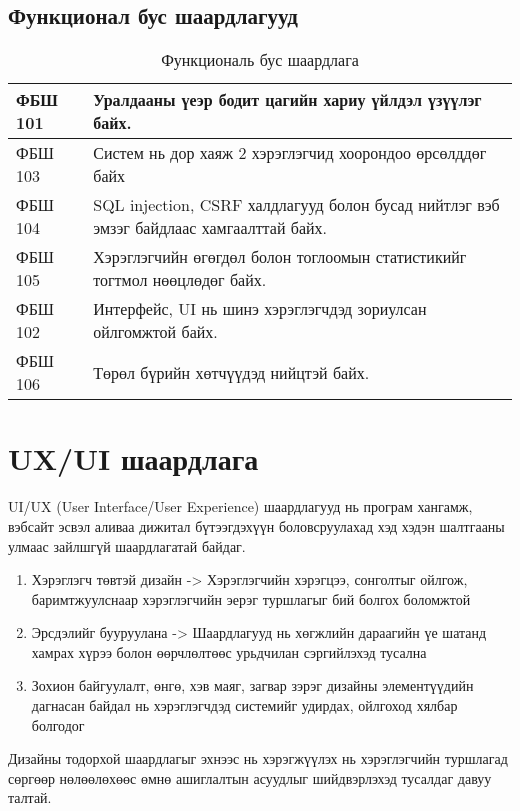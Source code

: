 \subsection{Функционал бус шаардлагууд}

\begin{table}[h]
	\centering
	\caption{Функциональ бус шаардлага}
	\begin{tabular}{ |p{2cm}|p{13cm}| }
		\hline
		ФБШ 101 & Уралдааны үеэр бодит цагийн хариу үйлдэл үзүүлэг байх.                                  \\ \hline
		ФБШ 103 & Систем нь дор хаяж 2 хэрэглэгчид хоорондоо өрсөлддөг байх                               \\ \hline
		ФБШ 104 & SQL injection, CSRF халдлагууд болон бусад нийтлэг вэб эмзэг байдлаас хамгаалттай байх. \\ \hline
		ФБШ 105 & Хэрэглэгчийн өгөгдөл болон тоглоомын статистикийг тогтмол нөөцлөдөг байх.               \\ \hline
		ФБШ 102 & Интерфейс, UI нь шинэ хэрэглэгчдэд зориулсан ойлгомжтой байх.                            \\ \hline
		ФБШ 106 & Төрөл бүрийн хөтчүүдэд нийцтэй байх.      \\  \hline
	\end{tabular}
\end{table}

\section{UX/UI шаардлага}

UI/UX (User Interface/User Experience) шаардлагууд нь програм хангамж, вэбсайт эсвэл аливаа дижитал бүтээгдэхүүн боловсруулахад хэд хэдэн шалтгааны улмаас зайлшгүй шаардлагатай байдаг.

\begin{enumerate}
	\item Хэрэглэгч төвтэй дизайн -> Хэрэглэгчийн хэрэгцээ, сонголтыг ойлгож, баримтжуулснаар хэрэглэгчийн эерэг туршлагыг бий болгох боломжтой
	\item Эрсдэлийг бууруулана -> Шаардлагууд нь хөгжлийн дараагийн үе шатанд хамрах хүрээ болон өөрчлөлтөөс урьдчилан сэргийлэхэд тусална
	\item Зохион байгуулалт, өнгө, хэв маяг, загвар зэрэг дизайны элементүүдийн дагнасан байдал нь хэрэглэгчдэд системийг удирдах, ойлгоход хялбар болгодог
\end{enumerate}

Дизайны тодорхой шаардлагыг эхнээс нь хэрэгжүүлэх нь хэрэглэгчийн туршлагад сөргөөр нөлөөлөхөөс өмнө ашиглалтын асуудлыг шийдвэрлэхэд тусалдаг давуу талтай.

